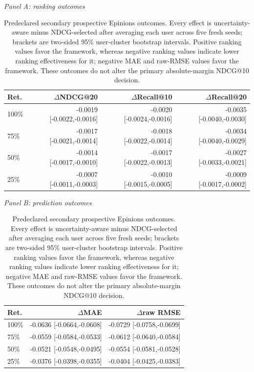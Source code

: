\begin{table}[H]
\centering
\caption{Predeclared secondary prospective Epinions outcomes. Every effect is uncertainty-aware minus NDCG-selected after averaging each user across five fresh seeds; brackets are two-sided 95\% user-cluster bootstrap intervals. Positive ranking values favor the framework, whereas negative ranking values indicate lower ranking effectiveness for it; negative MAE and raw-RMSE values favor the framework. These outcomes do not alter the primary absolute-margin NDCG@10 decision.}
\label{tab:supp-prospective-secondary}
\small
\textit{Panel A: ranking outcomes}\par\smallskip
\begin{tabular}{@{}lrrr@{}}
\toprule
Ret. & $\Delta$NDCG@20 & $\Delta$Recall@10 & $\Delta$Recall@20 \\
\midrule
100\% & -0.0019 [-0.0022,-0.0016] & -0.0020 [-0.0024,-0.0016] & -0.0035 [-0.0040,-0.0030] \\
75\% & -0.0017 [-0.0021,-0.0014] & -0.0018 [-0.0022,-0.0014] & -0.0034 [-0.0040,-0.0029] \\
50\% & -0.0014 [-0.0017,-0.0010] & -0.0017 [-0.0022,-0.0013] & -0.0027 [-0.0033,-0.0021] \\
25\% & -0.0007 [-0.0011,-0.0003] & -0.0010 [-0.0015,-0.0005] & -0.0009 [-0.0017,-0.0002] \\
\bottomrule
\end{tabular}
\par\medskip
\textit{Panel B: prediction outcomes}\par\smallskip
\begin{tabular}{@{}lrr@{}}
\toprule
Ret. & $\Delta$MAE & $\Delta$raw RMSE \\
\midrule
100\% & -0.0636 [-0.0664,-0.0608] & -0.0729 [-0.0758,-0.0699] \\
75\% & -0.0559 [-0.0584,-0.0533] & -0.0612 [-0.0640,-0.0584] \\
50\% & -0.0521 [-0.0548,-0.0495] & -0.0554 [-0.0581,-0.0528] \\
25\% & -0.0376 [-0.0398,-0.0355] & -0.0404 [-0.0425,-0.0383] \\
\bottomrule
\end{tabular}
\end{table}

